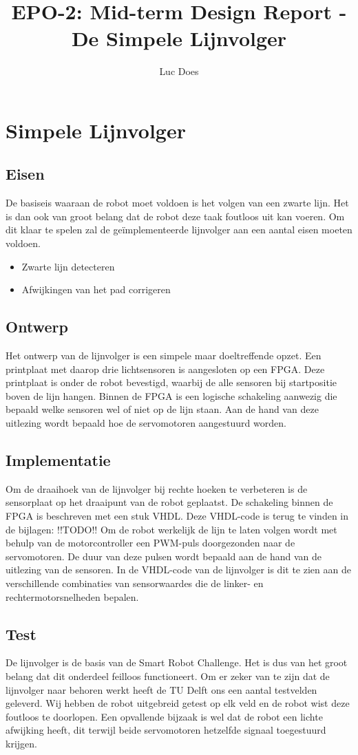 \documentclass{report}
\title{EPO-2: Mid-term Design Report - De Simpele Lijnvolger}
\author{Luc Does}
\begin{document}
\chapter{Simpele Lijnvolger}
\label{ch:lijnvolger}

\section{Eisen}
De basiseis waaraan de robot moet voldoen is het volgen van een zwarte lijn. Het is dan ook van groot belang dat de robot deze taak foutloos uit kan voeren. Om dit klaar te spelen zal de geïmplementeerde lijnvolger aan een aantal eisen moeten voldoen.

\begin{itemize}
\item Zwarte lijn detecteren
\item Afwijkingen van het pad corrigeren
\end{itemize}

\section{Ontwerp}
Het ontwerp van de lijnvolger is een simpele maar doeltreffende opzet. Een printplaat met daarop drie lichtsensoren is aangesloten op een FPGA. Deze printplaat is onder de robot bevestigd, waarbij de alle sensoren bij startpositie boven de lijn hangen. Binnen de FPGA is een logische schakeling aanwezig die bepaald welke sensoren wel of niet op de lijn staan. Aan de hand van deze uitlezing wordt bepaald hoe de servomotoren aangestuurd worden.

\section{Implementatie}
Om de draaihoek van de lijnvolger bij rechte hoeken te verbeteren is de sensorplaat op het draaipunt van de robot geplaatst. De schakeling binnen de FPGA is beschreven met een stuk VHDL. Deze VHDL-code is terug te vinden in de bijlagen: !!TODO!! Om de robot werkelijk de lijn te laten volgen wordt met behulp van de motorcontroller een PWM-puls doorgezonden naar de servomotoren. De duur van deze pulsen wordt bepaald aan de hand van de uitlezing van de sensoren. In de VHDL-code
van de lijnvolger is dit te zien aan de verschillende combinaties van sensorwaardes die de linker- en rechtermotorsnelheden bepalen.

\section{Test}
De lijnvolger is de basis van de Smart Robot Challenge. Het is dus van het groot belang dat dit onderdeel feilloos functioneert. Om er zeker van te zijn dat de lijnvolger naar behoren werkt heeft de TU Delft ons een aantal testvelden geleverd. Wij hebben de robot uitgebreid getest op elk veld en de robot wist deze foutloos te doorlopen. Een opvallende bijzaak is wel dat de robot een lichte afwijking heeft, dit terwijl beide servomotoren hetzelfde signaal toegestuurd krijgen.
\end{document}

